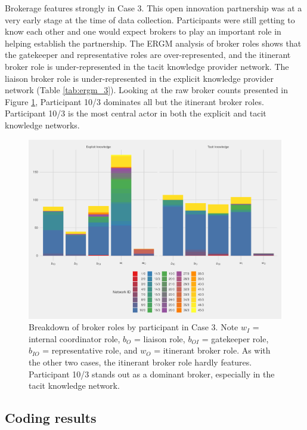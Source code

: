 Brokerage features strongly in Case 3. This open innovation partnership was at a very early stage at the time of data collection. Participants were still getting to know each other and one would expect brokers to play an important role in helping establish the partnership. The ERGM analysis of broker roles shows that the gatekeeper and representative roles are over-represented, and the itinerant broker role is under-represented in the tacit knowledge provider network. The liaison broker role is under-represented in the explicit knowledge provider network (Table \ref{tab:ergm_3}). Looking at the raw broker counts presented in Figure \ref{fig:gf_c3}, Participant 10/3 dominates all but the itinerant broker roles. Participant 10/3 is the most central actor in both the explicit and tacit knowledge networks.

\begin{figure}
\centering
\includegraphics[width = \textwidth]{Images/gf_case3.pdf}
\caption[Breakdown of broker roles by participant in Case 3]{Breakdown of broker roles by participant in Case 3. Note $w_I$ = internal coordinator role, $b_O$ = liaison role, $b_{OI}$ = gatekeeper role, $b_{IO}$ = representative role, and $w_O$ = itinerant broker role. As with the other two cases, the itinerant broker role hardly features. Participant 10/3 stands out as a dominant broker, especially in the tacit knowledge network.}
\label{fig:gf_c3}
\end{figure}

\subsection{Coding results}

